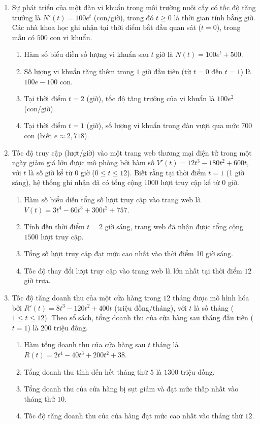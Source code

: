 \documentclass[12pt]{article}
\begin{document}
\begin{enumerate}[label=\textbf{Câu \arabic*.}, start=1]
		\item Sự phát triển của một đàn vi khuẩn trong môi trường nuôi cấy có tốc độ tăng trưởng là $N'(t) = 100e^t$ (con/giờ), trong đó $t \ge 0$ là thời gian tính bằng giờ. Các nhà khoa học ghi nhận tại thời điểm bắt đầu quan sát ($t = 0$), trong mẫu có $500$ con vi khuẩn.
		\begin{enumerate}[label=\alph*)]
			\item Hàm số biểu diễn số lượng vi khuẩn sau $t$ giờ là $N(t) = 100e^t + 500$.
			\item Số lượng vi khuẩn tăng thêm trong $1$ giờ đầu tiên (từ $t=0$ đến $t=1$) là $100e - 100$ con.
			\item Tại thời điểm $t = 2$ (giờ), tốc độ tăng trưởng của vi khuẩn là $100e^2$ (con/giờ).
			\item Tại thời điểm $t = 1$ (giờ), số lượng vi khuẩn trong đàn vượt qua mức $700$ con (biết $e \approx 2,718$).
		\end{enumerate}
		\item Tốc độ truy cập (lượt/giờ) vào một trang web thương mại điện tử trong một ngày giảm giá lớn được mô phỏng bởi hàm số $V'(t) = 12t^3 - 180t^2 + 600t$, với $t$ là số giờ kể từ $0$ giờ ($0 \le t \le 12$). Biết rằng tại thời điểm $t=1$ (1 giờ sáng), hệ thống ghi nhận đã có tổng cộng $1000$ lượt truy cập kể từ $0$ giờ.
		\begin{enumerate}[label=\alph*)]
			\item Hàm số biểu diễn tổng số lượt truy cập vào trang web là $V(t) = 3t^4 - 60t^3 + 300t^2 + 757$.
			\item Tính đến thời điểm $t = 2$ giờ sáng, trang web đã nhận được tổng cộng $1500$ lượt truy cập.
			\item Tổng số lượt truy cập đạt mức cao nhất vào thời điểm 10 giờ sáng.
			\item Tốc độ thay đổi lượt truy cập vào trang web là lớn nhất tại thời điểm $12$ giờ trưa.
		\end{enumerate}
		
		\item Tốc độ tăng doanh thu của một cửa hàng trong $12$ tháng được mô hình hóa bởi $R'(t) = 8t^3 - 120t^2 + 400t$ (triệu đồng/tháng), với $t$ là số tháng ($1 \le t \le 12$). Theo sổ sách, tổng doanh thu của cửa hàng sau tháng đầu tiên ($t=1$) là $200$ triệu đồng.
		\begin{enumerate}[label=\alph*)]
			\item Hàm tổng doanh thu của cửa hàng sau $t$ tháng là $R(t) = 2t^4 - 40t^3 + 200t^2 + 38$.
			\item Tổng doanh thu tính đến hết tháng thứ $5$ là $1300$ triệu đồng.
			\item Tổng doanh thu của cửa hàng bị sụt giảm và đạt mức thấp nhất vào tháng thứ $10$.
			\item Tốc độ tăng doanh thu của cửa hàng đạt mức cao nhất vào tháng thứ $12$.
		\end{enumerate}
		

\end{enumerate}
\end{document}
